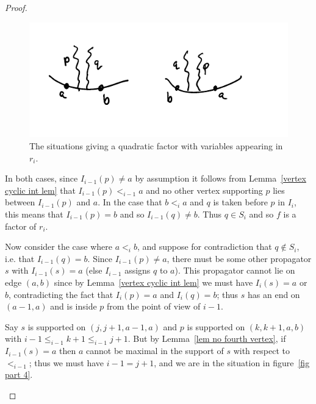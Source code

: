 \documentclass[11pt]{article}
\theoremstyle{remark}
\theoremstyle{definition}
\begin{document}
\begin{proof}
\begin{enumerate}
\begin{figure}
  \includegraphics{quadratic}
  \caption{The situations giving a quadratic factor with variables appearing in $r_i$.}\label{fig quadratic}
\end{figure}

In both cases, since $I_{i-1}(p)\neq a$ by assumption it follows from Lemma~\ref{vertex cyclic int lem} that $I_{i-1}(p) <_{i-1} a$ and no other vertex supporting $p$ lies between $I_{i-1}(p)$ and $a$. In the case that $b<_i a$ and $q$ is taken before $p$ in $I_i$, this means that $I_{i-1}(p)=b$ and so $I_{i-1}(q)\neq b$.  Thus $q\in S_i$ and so $f$ is a factor of $r_i$.

Now consider the case where $a<_i b$, and suppose for contradiction that $q \not\in S_i$, i.e. that $I_{i-1}(q) = b$. Since $I_{i-1}(p) \neq a$, there must be some other propagator $s$ with $I_{i-1}(s) = a$ (else $I_{i-1}$ assigns $q$ to $a$). This propagator cannot lie on edge $(a,b)$ since by Lemma~\ref{vertex cyclic int lem} we must have $I_i(s) = a$ or $b$, contradicting the fact that $I_i(p) = a$ and $I_i(q) = b$; thus $s$ has an end on $(a-1,a)$ and is inside $p$ from the point of view of $i-1$.

Say $s$ is supported on $(j, j+1, a-1, a)$ and $p$ is supported on $(k, k+1, a, b)$ with $i-1 \leq_{i-1} k+1 \leq_{i-1} j+1$. But by Lemma~\ref{lem no fourth vertex}, if $I_{i-1}(s) = a$ then $a$ cannot be maximal in the support of $s$ with respect to $<_{i-1}$; thus we must have $i-1 = j+1$, and we are in the situation in figure~\ref{fig part 4}.


\end{enumerate}
\end{proof}
\end{document}
